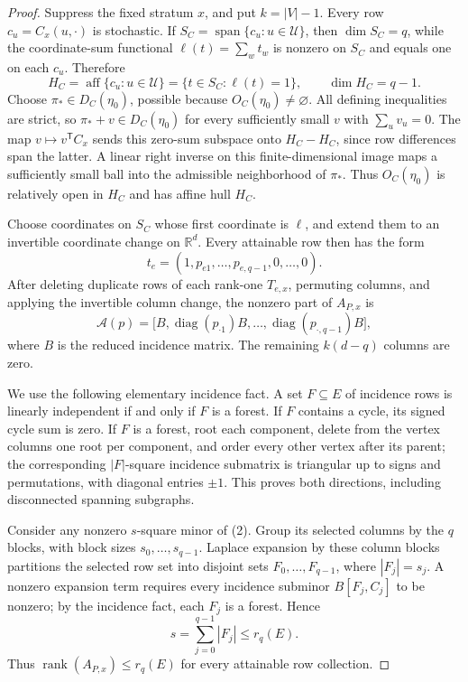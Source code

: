 \documentclass{article}
\begin{document}
\begin{proof}
Suppress the fixed stratum \(x\), and put \(k=|V|-1\).  Every row \(c_u=C_x(u,\cdot)\) is stochastic.  If \(S_C=\operatorname{span}\{c_u:u\in\mathcal U\}\), then \(\dim S_C=q\), while the coordinate-sum functional \(\ell(t)=\sum_wt_w\) is nonzero on \(S_C\) and equals one on each \(c_u\).  Therefore
\[
H_C=\operatorname{aff}\{c_u:u\in\mathcal U\}
=\{t\in S_C:\ell(t)=1\},
\qquad \dim H_C=q-1.
\tag{1}
\]
Choose \(\pi_*\in D_C(\eta_0)\), possible because \(O_C(\eta_0)\ne\varnothing\).  All defining inequalities are strict, so \(\pi_*+v\in D_C(\eta_0)\) for every sufficiently small \(v\) with \(\sum_uv_u=0\).  The map \(v\mapsto v^{\mathsf T}C_x\) sends this zero-sum subspace onto \(H_C-H_C\), since row differences span the latter.  A linear right inverse on this finite-dimensional image maps a sufficiently small ball into the admissible neighborhood of \(\pi_*\).  Thus \(O_C(\eta_0)\) is relatively open in \(H_C\) and has affine hull \(H_C\).

Choose coordinates on \(S_C\) whose first coordinate is \(\ell\), and extend them to an invertible coordinate change on \(\mathbb R^d\).  Every attainable row then has the form
\[
t_e=(1,p_{e1},\ldots,p_{e,q-1},0,\ldots,0).
\]
After deleting duplicate rows of each rank-one \(T_{e,x}\), permuting columns, and applying the invertible column change, the nonzero part of \(A_{P,x}\) is
\[
\mathcal A(p)=
\bigl[B,\operatorname{diag}(p_{\cdot1})B,\ldots,
\operatorname{diag}(p_{\cdot,q-1})B\bigr],
\tag{2}
\]
where \(B\) is the reduced incidence matrix.  The remaining \(k(d-q)\) columns are zero.

We use the following elementary incidence fact.  A set \(F\subseteq E\) of incidence rows is linearly independent if and only if \(F\) is a forest.  If \(F\) contains a cycle, its signed cycle sum is zero.  If \(F\) is a forest, root each component, delete from the vertex columns one root per component, and order every other vertex after its parent; the corresponding \(|F|\)-square incidence submatrix is triangular up to signs and permutations, with diagonal entries \(\pm1\).  This proves both directions, including disconnected spanning subgraphs.

Consider any nonzero \(s\)-square minor of (2).  Group its selected columns by the \(q\) blocks, with block sizes \(s_0,\ldots,s_{q-1}\).  Laplace expansion by these column blocks partitions the selected row set into disjoint sets \(F_0,\ldots,F_{q-1}\), where \(|F_j|=s_j\).  A nonzero expansion term requires every incidence subminor \(B[F_j,C_j]\) to be nonzero; by the incidence fact, each \(F_j\) is a forest.  Hence
\[
s=\sum_{j=0}^{q-1}|F_j|\le r_q(E).
\tag{3}
\]
Thus \(\operatorname{rank}(A_{P,x})\le r_q(E)\) for every attainable row collection.


\end{proof}
\end{document}
